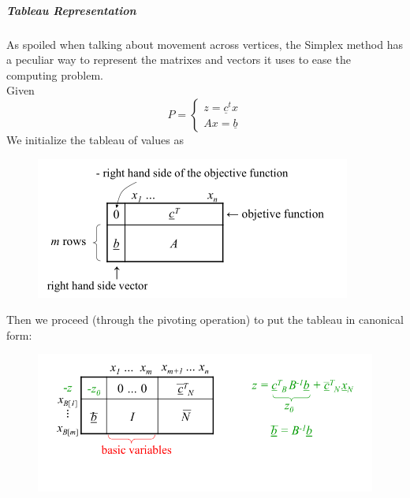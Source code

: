                 \subparagraph{Tableau Representation}
                    As spoiled when talking about movement across
                    vertices, the Simplex method has a peculiar
                    way to represent the matrixes
                    and vectors it uses to ease the computing problem.\\
                    Given
                    \begin{equation}
                        P = 
                        \begin{cases}
                            z=\underline{c}^t x\\
                            Ax = \underline{b}
                        \end{cases}
                    \end{equation}
                    We initialize the tableau of values as
                    \begin{figure}[H]
                        \centering
                        \includegraphics[width = \textwidth]{./images/Simplex2.png}
                    \end{figure}
                    Then we proceed (through the pivoting operation) to put the tableau in canonical form:
                    \begin{figure}[H]
                        \centering
                        \includegraphics[width = \textwidth]{./images/Simplex3.png}
                    \end{figure}


